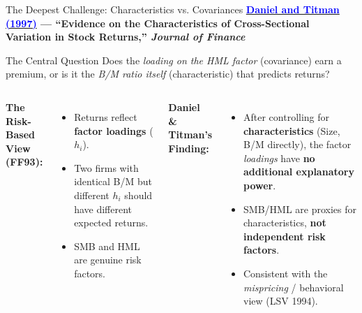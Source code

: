 \documentclass{beamer}
\begin{document}
\begin{frame}{The Deepest Challenge: Characteristics vs. Covariances}
	\textbf{\href{https://doi.org/10.1111/j.1540-6261.1997.tb02724.x}{\textcolor{blue}{Daniel and Titman (1997)}} --- ``Evidence on the Characteristics of Cross-Sectional Variation in Stock Returns,'' \textit{Journal of Finance}}
	\vspace{6pt}
	\begin{block}{The Central Question}
		Does the \textit{loading on the HML factor} (covariance) earn a premium, or is it the \textit{B/M ratio itself} (characteristic) that predicts returns?
	\end{block}
	\vspace{6pt}
	\begin{columns}
		\textbf{The Risk-Based View (FF93):}
		\begin{itemize}
			\item Returns reflect \textbf{factor loadings} ($h_i$).
			\item Two firms with identical B/M but different $h_i$ should have different expected returns.
			\item SMB and HML are genuine risk factors.
		\end{itemize}
		\textbf{Daniel \& Titman's Finding:}
		\begin{itemize}
			\item After controlling for \textbf{characteristics} (Size, B/M directly), the factor \textit{loadings} have \textbf{no additional explanatory power}.
			\item SMB/HML are proxies for characteristics, \textbf{not independent risk factors}.
			\item Consistent with the \textit{mispricing} / behavioral view (LSV 1994).
		\end{itemize}
	\end{columns}
\end{frame}
\end{document}
